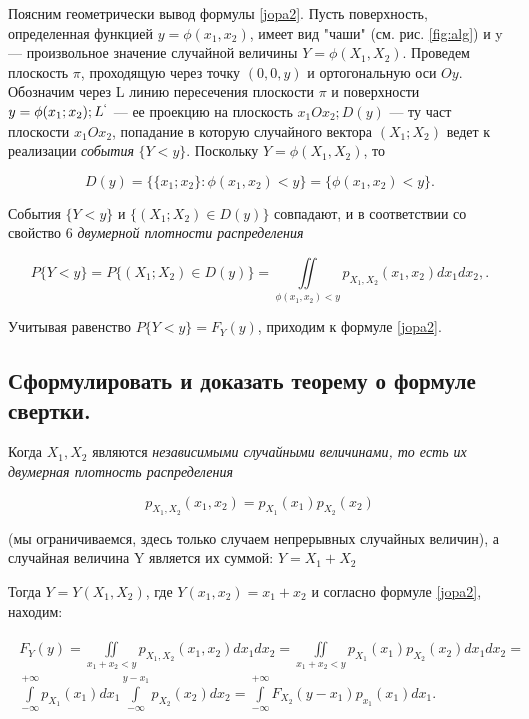 Поясним геометрически вывод формулы \ref{jopa2}. Пусть поверхность, определенная функцией $y = \phi(x_1, x_2)$, имеет вид "чаши" (см. рис. \ref{fig:alg}) и y --- произвольное значение случайной величины $Y = \phi(X_1, X_2)$. Проведем плоскость $\pi$, проходящую через точку $(0, 0, y)$ и ортогональную оси $Oy$. Обозначим через L линию пересечения плоскости $\pi$ и поверхности $y = \phi(x_1;x_2); L^{`}$ --- ее проекцию на плоскость $x_1Ox_2; D(y)$ --- ту част плоскости $x_1Ox_2$, попадание в которую случайного вектора $(X_1;X_2)$ ведет к реализации \textit{события} $\{Y < y\}$. Поскольку $Y = \phi(X_1, X_2)$, то

\begin{equation}
	D(y) = \{\{x_1; x_2\} : \phi(x_1, x_2) < y\} = \{\phi(x_1, x_2) < y\}.
\end{equation}

События $\{Y < y\}$ и $\{(X_1; X_2) \in D(y)\}$ совпадают, и в соответствии со свойство 6 \textit{двумерной плотности распределения}

\begin{equation}
	P\{Y < y\} = P\{(X_1; X_2) \in D(y)\} = \iint\limits_{\phi(x_1, x_2) < y} p_{X_1, X_2}(x_1, x_2)dx_1dx_2,.
\end{equation}

Учитывая равенство $P\{Y < y\} = 	F_Y(y)$, приходим к формуле \ref{jopa2}.

\subsection{Сформулировать и доказать теорему о формуле свертки.}

Когда $X_1, X_2$ являются \textit{независимыми случайными величинами, то есть их двумерная плотность распределения}

\begin{equation}
	p_{X_1, X_2}(x_1, x_2) = p_{X_1}(x_1)p_{X_2}(x_2)
\end{equation}

(мы ограничиваемся, здесь только случаем непрерывных случайных величин), а случайная величина Y является их суммой: $Y = X_1 + X_2$

Тогда $Y = Y(X_1, X_2)$, где $Y(x_1, x_2) = x_1 + x_2$ и согласно формуле \ref{jopa2}, находим:

\begin{align}
	\begin{split}
	F_Y(y) = \iint\limits_{x_1 + x_2 < y} p_{X_1, X_2}(x_1, x_2)dx_1dx_2 =  \iint\limits_{x_1 + x_2 < y} p_{X_1}(x_1) p_{X_2}(x_2)dx_1dx_2 =\\ \int\limits_{-\infty}^{+\infty} p_{X_1}(x_1)dx_1 \int\limits_{-\infty}^{y-x_1} p_{X_2}(x_2)dx_2 =
	\int\limits_{-\infty}^{+\infty}F_{X_2}(y-x_1)p_{x_1}(x_1)dx_1.
	\end{split}
\end{align}

